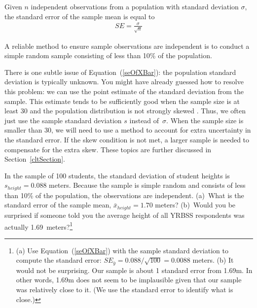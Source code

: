 \begin{termBox}{
Given $n$ independent observations from a population with standard deviation $\sigma$, the standard error of the sample mean is equal to \vspace{-1mm}
\begin{eqnarray}
SE = \frac{\sigma}{\sqrt{n}}
\label{seOfXBar}
\end{eqnarray}\vspace{-3mm}%

A reliable method to ensure sample observations are independent is to conduct a simple random sample consisting of less than 10\% of the population.
}
\end{termBox}

There is one subtle issue of Equation~(\ref{seOfXBar}): the population standard deviation is typically unknown. You might have already guessed how to resolve this problem: we can use the point estimate of the standard deviation from the sample. This estimate tends to be sufficiently good when the sample size is at least 30 and the population distribution is not strongly skewed%
. Thus, we often just use the sample standard deviation $s$ instead of~$\sigma$. When the sample size is smaller than 30, we will need to use a method to account for extra uncertainty in the standard error. If the skew condition is not met, a larger sample is needed to compensate for the extra skew. These topics are further discussed in Section~\ref{cltSection}.

\begin{exercise}
In the sample of 100 students, the standard deviation of student heights is $s_{height} = 0.088$ meters. Because the sample is simple random and consists of less than 10\% of the population, the observations are independent. (a)~What is the standard error of the sample mean, $\bar{x}_{height} = 1.70$ meters? (b)~Would you be surprised if someone told you the average height of all YRBSS respondents was actually 1.69~meters?\footnote{(a) Use Equation~(\ref{seOfXBar}) with the sample standard deviation to compute the standard error: $SE_{\bar{y}} = 0.088 / \sqrt{100} = 0.0088$ meters. (b) It would not be surprising. Our sample is about 1 standard error from 1.69m. In other words, 1.69m does not seem to be implausible given that our sample was relatively close to it. (We use the standard error to identify what is close.)}
\end{exercise}


